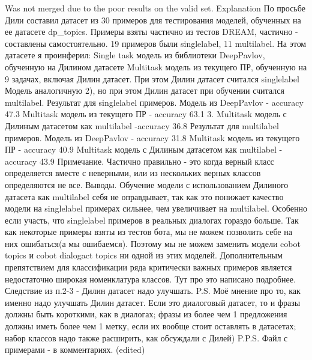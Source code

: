 Was not merged due to the poor results on the valid set. Explanation 
По просьбе Дили составил датасет из 30 примеров для тестирования моделей, обученных на ее датасете dp_topics. Примеры взяты частично из тестов DREAM, частично - составлены самостоятельно.  19 примеров были singlelabel, 11 multilabel.
На этом датасете я проинферил:
Single task модель из библиотеки DeepPavlov, обученную на Дилином датасете
 Multitask модель из текущего ПР, обученную на 9 задачах, включая Дилин датасет. При этом Дилин датасет считался singlelabel
Модель аналогичную 2), но при этом Дилин датасет при обучении считался multilabel.
Результат для singlelabel примеров.
Модель из DeepPavlov - accuracy 47.3%
Multitask модель из текущего ПР - accuracy 63.1%
 3.  Multitask модель с Дилиным датасетом как multilabel -accuracy 36.8%
Результат для multilabel примеров.
Модель из DeepPavlov - accuracy 31.8%
Multitask модель из текущего ПР - accuracy 40.9%
Multitask модель с Дилиным датасетом как multilabel - accuracy 43.9%
Примечание. Частично правильно - это когда верный класс определяется вместе с неверными, или из нескольких верных классов определяются не все.
Выводы.
Обучение модели с использованием Дилиного датасета как multilabel себя не оправдывает, так как это понижает качество модели на singlelabel примерах сильнее, чем увеличивает на multilabel. Особенно если участь, что singlelabel примеров в реальных диалогах гораздо больше.
Так как некоторые примеры взяты из тестов бота, мы не можем позволить себе на них ошибаться(а мы ошибаемся). Поэтому мы не можем заменить модели cobot topics и cobot dialogact topics ни одной из этих моделей.
Дополнительным препятствием для классификации ряда критически важных примеров является недостаточно широкая номенклатура классов. Тут про это написано подробнее.
Следствие из п.2-3 - Дилин датасет надо улучшать.
P.S. Моё мнение про то, как именно надо улучшать Дилин датасет. Если это диалоговый датасет, то и фразы должны быть короткими, как в диалогах; фразы из более чем 1 предложения должны иметь более чем 1 метку, если их вообще стоит оставлять в датасетах; набор классов надо также расширить, как обсуждали с Дилей)
P.P.S. Файл с примерами - в комментариях. (edited) 






